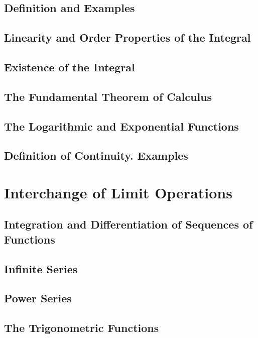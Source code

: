 \documentclass{article}
\begin{document}
		\subsection{Definition and Examples}
		
		\subsection{Linearity and Order Properties of the Integral}
		
		\subsection{Existence of the Integral}
		
		\subsection{The Fundamental Theorem of Calculus}
		
		\subsection{The Logarithmic and Exponential Functions}
		
		\subsection{Definition of Continuity. Examples}
	
	
	\section{Interchange of Limit Operations}
		\subsection{Integration and Differentiation of Sequences of Functions}
		
		\subsection{Infinite Series}
		
		\subsection{Power Series}
		
		\subsection{The Trigonometric Functions}
		
\end{document}
